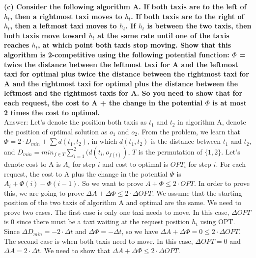\documentclass{article}
\begin{document}
\textbf{(c) Consider the following algorithm A. If both taxis are to the left of $h_t$, then a rightmost taxi moves to $h_t$. If both taxis are to the right of $h_t$, then a leftmost taxi moves to $h_t$. If $h_t$ is between the two taxis, then both taxis move toward $h_t$ at the same rate until one of the taxis reaches $h_t$, at which point both taxis stop moving. Show that this algorithm is 2-competitive using the following potential function: $\Phi$ = twice the distance between the leftmost taxi for A and the leftmost taxi for optimal plus twice the distance between the rightmost taxi for A and the rightmost taxi for optimal plus the distance between the leftmost and the rightmost taxis for A. So you need to show that for each request, the cost to A + the change in the potential $\Phi$ is at most 2 times the cost to optimal.
}\\ \newline
Answer: Let's denote the position both taxis as $t_1$ and $t_2$ in algorithm A, denote the position of optimal solution as $o_1$ and $o_2$. From the problem, we learn that $\Phi = 2\cdot D_{min} + \sum d(t_1, t_2)$, in which $d(t_1, t_2)$ is the distance between $t_1$ and $t_2$, and $D_{min} = min_{f\in T}\sum_{i=1}^2(d(t_i, o_{f(i)})$, $T$ is the permutation of $\{1,2\}$. Let's denote cost to A is $A_i$ for step $i$ and cost to optimal is $OPT_i$ for step $i$. For each request, the cost to A plus the change in the potential $\Phi$ is $A_i + \Phi(i) - \Phi(i-1)$. So we want to prove $A + \Phi \leq 2\cdot OPT$. In order to prove this, we are going to prove $\Delta A + \Delta \Phi \leq 2 \cdot \Delta OPT$. We assume that the starting position of the two taxis of algorithm A and optimal are the same. We need to prove two cases. The first case is only one taxi needs to move. In this case, $\Delta OPT$ is 0 since there must be a taxi waiting at the request position $h_t$ using OPT. Since $\Delta D_{min} = -2\cdot \Delta t$ and $\Delta \Phi = -\Delta t$, so we have $\Delta A + \Delta \Phi = 0 \leq 2\cdot \Delta OPT$. The second case is when both taxis need to move.  In this case, $\Delta OPT = 0$ and $\Delta A = 2\cdot \Delta t$. We need to show that $\Delta A + \Delta \Phi \leq 2 \cdot \Delta OPT$.
\end{document}
